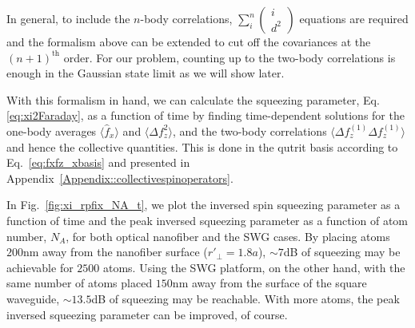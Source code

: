 \documentclass[preprint,aps,pra,onecolumn,superscriptaddress]{revtex4-1} %
\newcommand{\expect}[1]{\big\langle #1 \big\rangle}
\begin{document}
In general, to include the $ n $-body correlations, $ \sum_i^n\left(\!\begin{array}{c}i\\d^2\end{array} \! \right) $ equations are required and the formalism above can be extended to cut off the covariances at the $ (n+1)^{\text{th}} $ order. For our problem, counting up to the two-body correlations is enough in the Gaussian state limit as we will show later.

With this formalism in hand, we can calculate the squeezing parameter, Eq.\eqref{eq:xi2Faraday}, as a function of time by finding time-dependent solutions for the one-body averages $\expect{\hat{f}_x}$ and  $\expect{\Delta f_z^2}$, and the two-body correlations $\expect{\Delta f_z^{(1)} \Delta f_z^{(1)}}$ and hence the collective quantities.  This is done in the qutrit basis according to Eq.~\eqref{eq:fxfz_xbasis} and presented in Appendix~\ref{Appendix::collectivespinoperators}. 

In Fig.~\ref{fig:xi_rpfix_NA_t}, we plot the inversed spin squeezing parameter as a function of time and the peak inversed squeezing parameter as a function of atom number, $ N_A $, for both optical nanofiber and the SWG cases. By placing atoms $ 200 $nm away from the nanofiber surface ($ r'\!_\perp=1.8a $), $ \sim 7 $dB of squeezing may be achievable for $ 2500 $ atoms. Using the SWG platform, on the other hand, with the same number of atoms placed $150 $nm away from the surface of the square waveguide, $ \sim 13.5 $dB of squeezing may be reachable. With more atoms, the peak inversed squeezing parameter can be improved, of course.
\end{document}
